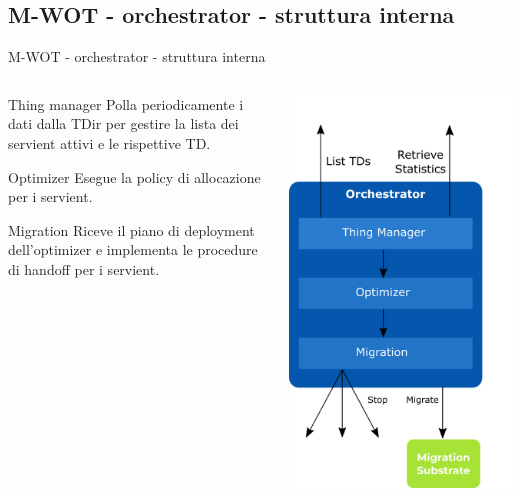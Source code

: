 \documentclass{beamer}
\begin{document}
\subsection{M-WOT - orchestrator - struttura interna}
\begin{frame}{M-WOT - orchestrator - struttura interna}
	\begin{columns}
		\begin{column}[c]{0.6\textwidth}
			\begin{block}{Thing manager}
				Polla periodicamente i dati dalla TDir per gestire la lista dei servient attivi e le rispettive TD.
			\end{block}
			\begin{block}{Optimizer}
				Esegue la policy di allocazione per i servient.
			\end{block}
			\begin{block}{Migration}
			Riceve il piano di deployment dell'optimizer e implementa le procedure di handoff per i servient.
			\end{block}
		\end{column}
		\begin{column}[c]{0.35\textwidth}
			\centering
			\includegraphics[width=\textwidth]{./images/8.png}

\end{column}
\end{columns}
\end{frame}
\end{document}
